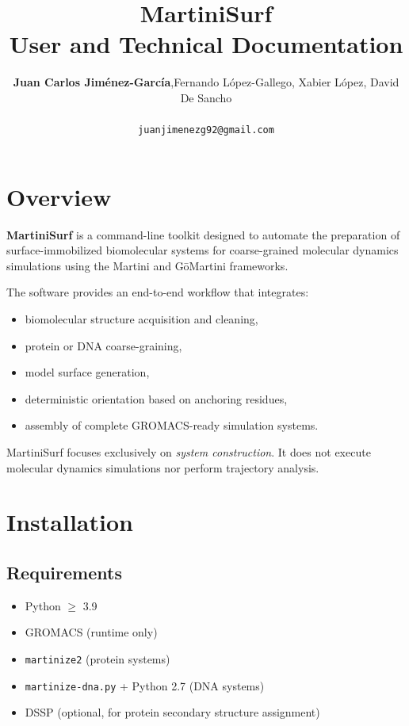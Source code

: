 \documentclass[11pt]{article}
\title{\textbf{MartiniSurf}\\
User and Technical Documentation}
\author{
\textbf{Juan Carlos Jiménez-García},Fernando López-Gallego, Xabier López, David De Sancho\\
\vspace{0.5em}
\small
\\
\small
\texttt{juanjimenezg92@gmail.com} 
}
\begin{document}
\maketitle

\tableofcontents
\newpage

\section{Overview}

\textbf{MartiniSurf} is a command-line toolkit designed to automate the preparation of
surface-immobilized biomolecular systems for coarse-grained molecular dynamics simulations
using the Martini and G\=oMartini frameworks.

The software provides an end-to-end workflow that integrates:
\begin{itemize}
  \item biomolecular structure acquisition and cleaning,
  \item protein or DNA coarse-graining,
  \item model surface generation,
  \item deterministic orientation based on anchoring residues,
  \item assembly of complete GROMACS-ready simulation systems.
\end{itemize}

MartiniSurf focuses exclusively on \emph{system construction}. It does not execute molecular
dynamics simulations nor perform trajectory analysis.

\section{Installation}

\subsection{Requirements}

\begin{itemize}
  \item Python $\geq$ 3.9
  \item GROMACS (runtime only)
  \item \texttt{martinize2} (protein systems)
  \item \texttt{martinize-dna.py} + Python 2.7 (DNA systems)
  \item DSSP (optional, for protein secondary structure assignment)
\end{itemize}
\end{document}
